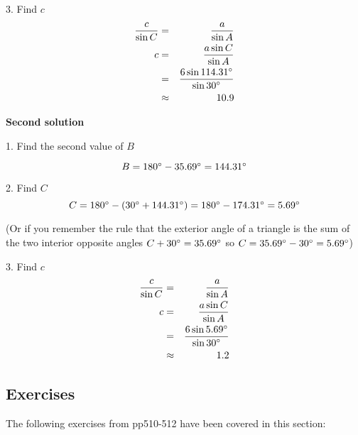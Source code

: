 3. Find $c$
\begin{align*}\frac{c}{\sin  C} &  = & \frac{a}{\sin  A} \\
c &  = & \frac{a \sin  C}{\sin  A} \\
 &  = & \frac{6 \sin  114.31 \mbox{{\ensuremath{{}^\circ}}}}{\sin  30 \mbox{{\ensuremath{{}^\circ}}}} \\
 &  \approx  & 10.9\end{align*}

\textbf{Second solution} 

1. Find the second value of $B$ 

\begin{equation*}B =180 \mbox{{\ensuremath{{}^\circ}}} -35.69 \mbox{{\ensuremath{{}^\circ}}} =144.31 \mbox{{\ensuremath{{}^\circ}}}
\end{equation*}

2. Find $C$
\begin{equation*}C =180 \mbox{{\ensuremath{{}^\circ}}} -(30 \mbox{{\ensuremath{{}^\circ}}} +144.31 \mbox{{\ensuremath{{}^\circ}}}) =180 \mbox{{\ensuremath{{}^\circ}}} -174.31 \mbox{{\ensuremath{{}^\circ}}} =5.69 \mbox{{\ensuremath{{}^\circ}}}
\end{equation*}

(Or if you remember the rule that the exterior angle of a triangle is the sum of the two interior
opposite angles $C +30 \mbox{{\ensuremath{{}^\circ}}} =35.69 \mbox{{\ensuremath{{}^\circ}}}$ so $C =35.69 \mbox{{\ensuremath{{}^\circ}}} -30 \mbox{{\ensuremath{{}^\circ}}} =5.69 \mbox{{\ensuremath{{}^\circ}}}$) 

3. Find $c$
\begin{align*}\frac{c}{\sin  C} &  = & \frac{a}{\sin  A} \\
c &  = & \frac{a \sin  C}{\sin  A} \\
 &  = & \frac{6 \sin  5.69 \mbox{{\ensuremath{{}^\circ}}}}{\sin  30 \mbox{{\ensuremath{{}^\circ}}}} \\
 &  \approx  & 1.2\end{align*}



\subsection{Exercises}
The following exercises from pp510-512 have been covered in this section: 

